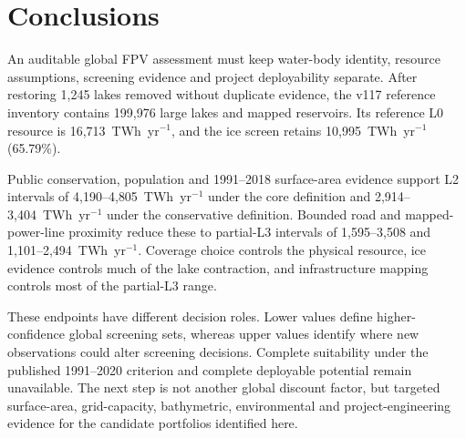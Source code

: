 \section{Conclusions}

An auditable global FPV assessment must keep water-body identity, resource assumptions, screening evidence and project deployability separate. After restoring 1{,}245 lakes removed without duplicate evidence, the v117 reference inventory contains 199{,}976 large lakes and mapped reservoirs. Its reference L0 resource is 16{,}713~TWh~yr$^{-1}$, and the ice screen retains 10{,}995~TWh~yr$^{-1}$ (65.79\%).

Public conservation, population and 1991--2018 surface-area evidence support L2 intervals of 4{,}190--4{,}805~TWh~yr$^{-1}$ under the core definition and 2{,}914--3{,}404~TWh~yr$^{-1}$ under the conservative definition. Bounded road and mapped-power-line proximity reduce these to partial-L3 intervals of 1{,}595--3{,}508 and 1{,}101--2{,}494~TWh~yr$^{-1}$. Coverage choice controls the physical resource, ice evidence controls much of the lake contraction, and infrastructure mapping controls most of the partial-L3 range.

These endpoints have different decision roles. Lower values define higher-confidence global screening sets, whereas upper values identify where new observations could alter screening decisions. Complete suitability under the published 1991--2020 criterion and complete deployable potential remain unavailable. The next step is not another global discount factor, but targeted surface-area, grid-capacity, bathymetric, environmental and project-engineering evidence for the candidate portfolios identified here.
